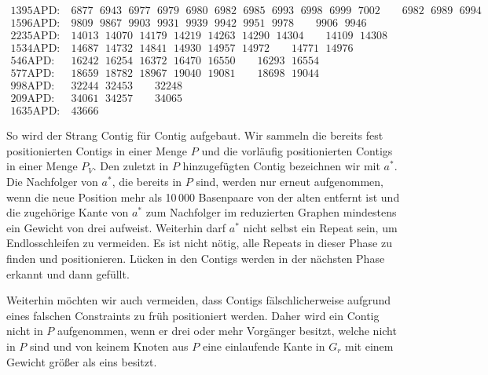 \begin{footnotesize}
	\begin{align*}
	\text{1395APD:}&\ 6877\ \ \,6943\ \ \,6977\ \ \,6979\ \ \,6980\ \ \,6982\ \ \,6985\ \ \,6993\ \ \,6998\ \ \,6999\ \ \,7002\quad\quad 6982\ \ \, 6989\ \ \,6994\\
	\text{1596APD:}&\ 9809\ \ \,9867\ \ \,9903\ \ \,9931\ \ \,9939\ \ \,9942\ \ \,9951\ \ \,9978\quad\quad 9906\ \ \,9946\\
	\text{2235APD:}&\ 14013\ \ \,14070\ \ \,14179\ \ \,14219\ \ \,14263\ \ \,14290\ \ \,14304\quad\quad 14109\ \ \,14308\\
	\text{1534APD:}&\ 14687\ \ \,14732\ \ \,14841\ \ \,14930\ \ \,14957\ \ \,14972\quad\quad 14771\ \ \,14976\\
	\text{546APD:}&\ 16242\ \ \,16254\ \ \,16372\ \ \,16470\ \ \,16550\quad\quad 16293\ \ \,16554\\
	\text{577APD:}&\ 18659\ \ \,18782\ \ \,18967\ \ \,19040\ \ \,19081\quad\quad 18698\ \ \,19044\\
	\text{998APD:}&\ 32244\ \ \,32453\quad\quad 32248\\
	\text{209APD:}&\ 34061\ \ \,34257\quad\quad 34065\\
	\text{1635APD:}&\ 43666
	\end{align*}
\end{footnotesize}

So wird der Strang Contig für Contig aufgebaut. Wir sammeln die bereits fest positionierten Contigs in einer Menge $P$ und die vorläufig positionierten Contigs in einer Menge $P_V$. %
Den zuletzt in $P$ hinzugefügten Contig bezeichnen wir mit $a^*$.
Die Nachfolger von $a^*$, die bereits in $P$ sind, werden 
nur erneut aufgenommen, wenn die neue Position mehr als 10\,000 Basenpaare von der alten entfernt ist und die zugehörige Kante von $a^*$ zum Nachfolger im reduzierten Graphen mindestens ein Gewicht von drei aufweist. 
Weiterhin darf $a^*$ nicht selbst ein Repeat sein, um Endlosschleifen zu vermeiden.
Es ist nicht nötig, alle Repeats in dieser Phase zu finden und positionieren. Lücken in den Contigs werden in der nächsten Phase erkannt und dann gefüllt.

Weiterhin möchten wir auch vermeiden, dass Contigs fälschlicherweise aufgrund eines falschen Constraints zu früh positioniert werden.
Daher wird ein Contig nicht in $P$ aufgenommen, wenn er drei oder mehr Vorgänger besitzt, welche nicht in $P$ sind und von keinem Knoten aus $P$ eine einlaufende Kante in $G_r$ mit einem Gewicht größer als eins besitzt.

